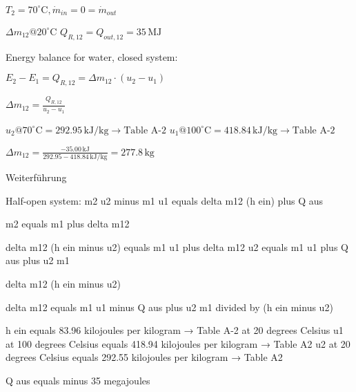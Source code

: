 \( T_2 = 70^\circ \text{C}, \dot{m}_{in} = 0 = \dot{m}_{out} \)  

\( \Delta m_{12} @ 20^\circ \text{C} \)  
\( Q_{R,12} = Q_{out,12} = 35 \, \text{MJ} \)  

Energy balance for water, closed system:  

\( E_2 - E_1 = Q_{R,12} = \Delta m_{12} \cdot (u_2 - u_1) \)  

\( \Delta m_{12} = \frac{Q_{R,12}}{u_2 - u_1} \)  

\( u_2 @ 70^\circ \text{C} = 292.95 \, \text{kJ/kg} \rightarrow \text{Table A-2} \)  
\( u_1 @ 100^\circ \text{C} = 418.84 \, \text{kJ/kg} \rightarrow \text{Table A-2} \)  

\( \Delta m_{12} = \frac{-35.00 \, \text{kJ}}{292.95 - 418.84 \, \text{kJ/kg}} = 277.8 \, \text{kg} \)

Weiterführung  

Half-open system:  
m2 u2 minus m1 u1 equals delta m12 (h ein) plus Q aus  

m2 equals m1 plus delta m12  

delta m12 (h ein minus u2) equals m1 u1 plus delta m12 u2 equals m1 u1 plus Q aus plus u2 m1  

delta m12 (h ein minus u2)  

delta m12 equals m1 u1 minus Q aus plus u2 m1 divided by (h ein minus u2)  

h ein equals 83.96 kilojoules per kilogram → Table A-2 at 20 degrees Celsius  
u1 at 100 degrees Celsius equals 418.94 kilojoules per kilogram → Table A2  
u2 at 20 degrees Celsius equals 292.55 kilojoules per kilogram → Table A2  

Q aus equals minus 35 megajoules